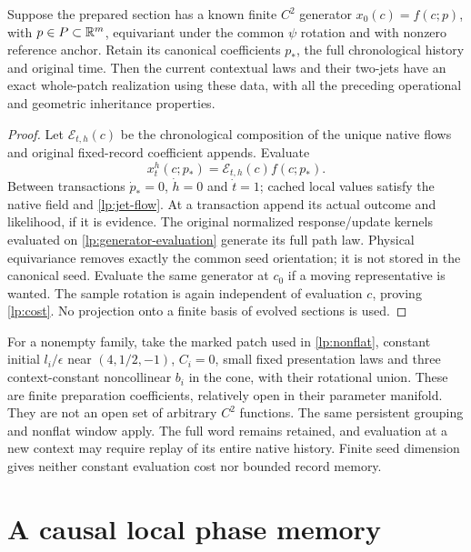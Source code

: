 Suppose the prepared section has a known finite $C^2$ generator $x_0(c)=f(c;p)$, with $p\in P\subset\mathbb R^m$, equivariant under the common $\psi$ rotation and with nonzero reference anchor. Retain its canonical coefficients $p_*$, the full chronological history and original time. Then the current contextual laws and their two-jets have an exact whole-patch realization using these data, with all the preceding operational and geometric inheritance properties.
\begin{proof}
Let $\mathcal E_{t,h}(c)$ be the chronological composition of the unique native flows and original fixed-record coefficient appends. Evaluate
\begin{equation}
 x_t^h(c;p_*)=\mathcal E_{t,h}(c)f(c;p_*).
 \label{lp:generator-evaluation}
\end{equation}
Between transactions $\dot p_*=0$, $\dot h=0$ and $\dot t=1$; cached local values satisfy the native field and \cref{lp:jet-flow}. At a transaction append its actual outcome and likelihood, if it is evidence. The original normalized response/update kernels evaluated on \cref{lp:generator-evaluation} generate its full path law. Physical equivariance removes exactly the common seed orientation; it is not stored in the canonical seed. Evaluate the same generator at $c_0$ if a moving representative is wanted. The sample rotation is again independent of evaluation $c$, proving \cref{lp:cost}. No projection onto a finite basis of evolved sections is used.
\end{proof}

For a nonempty family, take the marked patch used in \cref{lp:nonflat}, constant initial $l_i/\epsilon$ near $(4,1/2,-1)$, $C_i=0$, small fixed presentation laws and three context-constant noncollinear $b_i$ in the cone, with their rotational union. These are finite preparation coefficients, relatively open in their parameter manifold. They are not an open set of arbitrary $C^2$ functions. The same persistent grouping and nonflat window apply. The full word remains retained, and evaluation at a new context may require replay of its entire native history. Finite seed dimension gives neither constant evaluation cost nor bounded record memory.

\section{A causal local phase memory}

